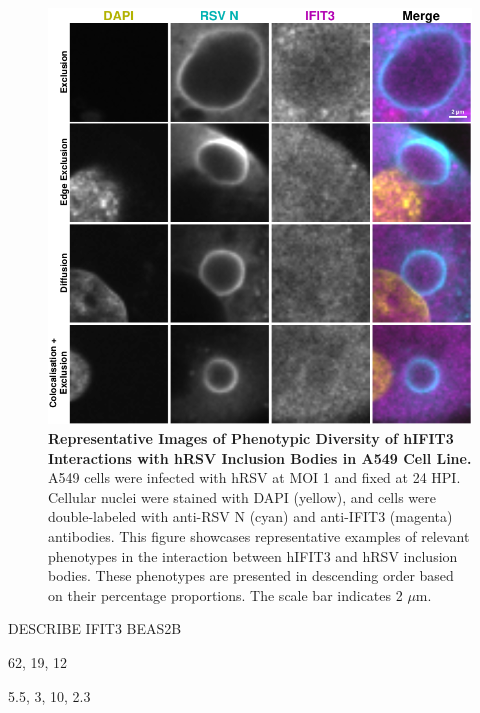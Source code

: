 \begin{figure}
    \centering
    \includegraphics[width=1\linewidth]{08. Chapter 3/Figs/02. Infection/03. IFIT3/03. a549 i3.pdf}
    \caption[Representative Images of Phenotypic Diversity of hIFIT3 Interactions with hRSV Inclusion Bodies in A549 Cell Line.]{\textbf{Representative Images of Phenotypic Diversity of hIFIT3 Interactions with hRSV Inclusion Bodies in A549 Cell Line.} A549 cells were infected with hRSV at MOI 1 and fixed at 24 HPI. Cellular nuclei were stained with DAPI (yellow), and cells were double-labeled with anti-RSV N (cyan) and anti-IFIT3 (magenta) antibodies. This figure showcases representative examples of relevant phenotypes in the interaction between hIFIT3 and hRSV inclusion bodies. These phenotypes are presented in descending order based on their percentage proportions. The scale bar indicates 2 \(\mu \mbox{m}\).}
    \label{fig:Representative Images of Phenotypic Diversity of hIFIT3 Interactions with hRSV Inclusion Bodies in A549 Cell Line}
\end{figure}

DESCRIBE IFIT3 BEAS2B

62, 19, 12

5.5, 3, 10, 2.3

